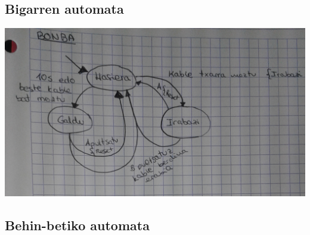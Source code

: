\documentclass[dvipsnames]{AritzhClass}
\begin{document}
\subsection{Bigarren automata}

\begin{center}\includegraphics[scale=0.25]{Bonba}\end{center}

\pagebreak

\subsection{Behin-betiko automata}
\end{document}
